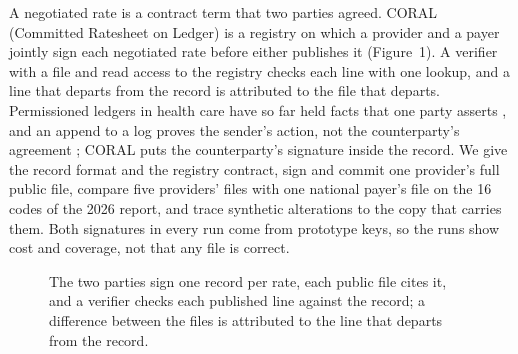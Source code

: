\documentclass{IOS-Book-Article}
\begin{document}
A negotiated rate is a contract term that two parties agreed. CORAL (Committed Ratesheet on Ledger) is a registry on which a provider and a payer jointly sign each negotiated rate before either publishes it (Figure~1). A verifier with a file and read access to the registry checks each line with one lookup, and a line that departs from the record is attributed to the file that departs. Permissioned ledgers in health care have so far held facts that one party asserts \cite{kuo2017}, and an append to a log proves the sender's action, not the counterparty's agreement \cite{zieglmeier2023}; CORAL puts the counterparty's signature inside the record. We give the record format and the registry contract, sign and commit one provider's full public file, compare five providers' files with one national payer's file on the 16 codes of the 2026 report, and trace synthetic alterations to the copy that carries them. Both signatures in every run come from prototype keys, so the runs show cost and coverage, not that any file is correct.

\begin{figure}[!htb]
\centering
{}
\caption{The two parties sign one record per rate, each public file cites it, and a verifier checks each published line against the record; a difference between the files is attributed to the line that departs from the record.}
\end{figure}
\end{document}
